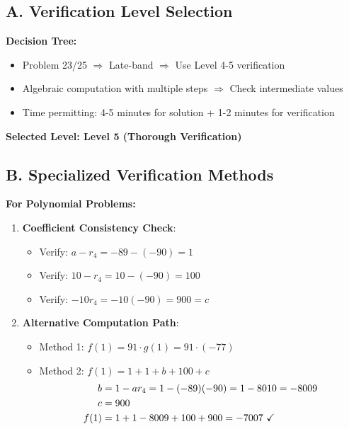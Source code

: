 \documentclass[]{article}
\begin{document}
\begin{verificationbox}
\subsection*{A. Verification Level Selection}

\textbf{Decision Tree:}
\begin{itemize}[leftmargin=*]
    \item Problem 23/25 $\Rightarrow$ Late-band $\Rightarrow$ Use Level 4-5 verification
    \item Algebraic computation with multiple steps $\Rightarrow$ Check intermediate values
    \item Time permitting: 4-5 minutes for solution + 1-2 minutes for verification
\end{itemize}

\textbf{Selected Level: Level 5 (Thorough Verification)}

\subsection*{B. Specialized Verification Methods}

\textbf{For Polynomial Problems:}
\begin{enumerate}[leftmargin=*]
    \item \textbf{Coefficient Consistency Check}:
    \begin{itemize}
        \item Verify: $a - r_4 = -89 - (-90) = 1$ \checkmark
        \item Verify: $10 - r_4 = 10 - (-90) = 100$ \checkmark
        \item Verify: $-10r_4 = -10(-90) = 900 = c$ \checkmark
    \end{itemize}
    
    \item \textbf{Alternative Computation Path}:
    \begin{itemize}
        \item Method 1: $f(1) = 91 \cdot g(1) = 91 \cdot (-77)$
        \item Method 2: $f(1) = 1 + 1 + b + 100 + c$
        \begin{align*}
            b &= 1 - ar_4 = 1 - (-89)(-90) = 1 - 8010 = -8009 \\
            c &= 900 \\
            f(1) &= 1 + 1 - 8009 + 100 + 900 = -7007 \text{ \checkmark}
        \end{align*}
    \end{itemize}
    

\end{enumerate}
\end{verificationbox}
\end{document}
